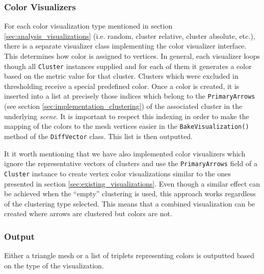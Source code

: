 \subsubsection{Color Visualizers}

For each color visualization type mentioned in section \ref{sec:analysis_visualizations} (i.e. random, cluster relative, cluster absolute, etc.), there is a separate visualizer class implementing the color visualizer interface. This determines how color is assigned to vertices. In general, each visualizer loops though all \verb+Cluster+ instances supplied and for each of them it generates a color based on the metric value for that cluster. Clusters which were excluded in thresholding receive a special predefined color. Once a color is created, it is inserted into a list at precisely those indices which belong to the \verb+PrimaryArrows+ (see section \ref{sec:implementation_clustering}) of the associated cluster in the underlying {\it scene}. It is important to respect this indexing in order to make the mapping of the colors to the mesh vertices easier in the \verb+BakeVisualization()+ method of the \verb+DiffVector+ class. This list is then outputted.

It it worth mentioning that we have also implemented color visualizers which ignore the representative vectors of clusters and use the \verb+PrimaryArrows+ field of a \verb+Cluster+ instance to create vertex color visualizations similar to the ones presented in section \ref{sec:existing_visualizations}. Even though a similar effect can be achieved when the ``empty'' clustering is used, this approach works regardless of the clustering type selected. This means that a combined visualization can be created where arrows are clustered but colors are not\footnotemark.


\subsubsection{Output}

Either a triangle mesh or a list of triplets representing colors is outputted based on the type of the visualization.
